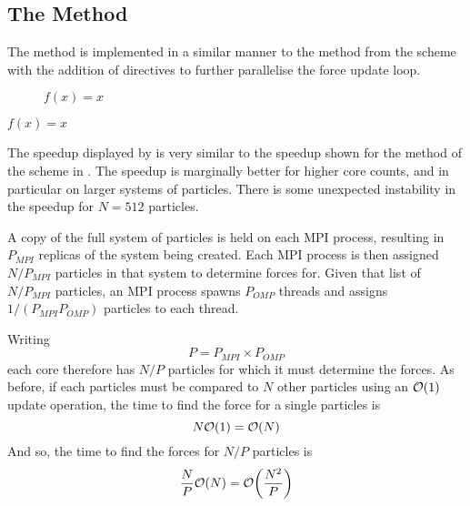 \subsection{The \pairoperation{} Method}

The \pairoperation{} method is implemented in a similar manner to the
\pairoperation{} method from the \replicateddata{} scheme with the
addition of \openmp{} directives to further parallelise the
force update loop.

%

%
%
\begin{figure}[!h]
    
    \caption{
        \vZeroSpeedupCaption
            {\sharedandreplicateddata{}}
            {\pairoperation{}}
            {$f(x) = x$}
    }
    \label{fig:v1_shared_and_replicated_data_pair_operation_speedups}
\end{figure}


\vZeroSpeedupExplanation
    {}
    {\sharedandreplicateddata{}}
    {\pairoperation{}}
    {$f(x) = x$}

The speedup displayed by 
is very similar to the speedup shown for the \pairoperation{}
method of the \replicateddata{} scheme in
.
%
The speedup is marginally better for higher core counts, and in
particular on larger systems of particles.
%
There is some unexpected instability in the speedup for $N=512$ particles.


%
A copy of the full system of particles is held on each MPI process,
resulting in $P_{MPI}$ replicas of the system being created.
%
Each MPI process is then assigned $N/P_{MPI}$ particles in that system
to determine forces for.
%
Given that list of $N/P_{MPI}$ particles,
an MPI process spawns $P_{OMP}$ threads
and assigns $1/(P_{MPI} P_{OMP})$ particles to each thread.

Writing
\begin{equation}
    \label{eqn:p_eq_pmpi_pomp}
    P = P_{MPI} \times{} P_{OMP}
\end{equation}
each core therefore has $N/P$ particles
for which it must determine the forces.
%
As before, if each particles must be compared to $N$ other particles
using an $\mathcal{O}{\left({ 1 }\right)}$ update operation, the time to find the force for
a single particles is
\begin{equation}
    N\mathcal{O}{\left({ 1 }\right)} = \mathcal{O}{\left({ N }\right)}
\end{equation}
And so, the time to find the forces for $N/P$ particles is
\begin{equation}
    \label{eqn:shared_and_replicated_calculation_time}
    \frac{N}{P}\mathcal{O}{\left({ N }\right)} = \mathcal{O}{\left({ \frac{N^2}{P} }\right)}
\end{equation}

